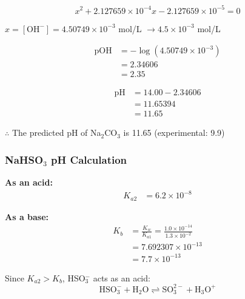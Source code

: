 \documentclass{article}
\begin{document}
\begin{equation*}
x^2 + 2.127659 \times 10^{-4}x - 2.127659 \times 10^{-5} = 0
\end{equation*}

$x = [\text{OH}^-] = 4.50749 \times 10^{-3}$ mol/L $\rightarrow 4.5 \times 10^{-3}$ mol/L

\vspace{0.1in}
\noindent
\begin{minipage}[t]{0.45\textwidth}
    \begin{align*}
        \text{pOH} &= -\log(4.50749 \times 10^{-3}) \\
        &= 2.34606 \\
        &= 2.35
    \end{align*}
\end{minipage}
\hfill
\begin{minipage}[t]{0.45\textwidth}
    \begin{align*}
        \text{pH} &= 14.00 - 2.34606 \\
        &= 11.65394 \\
        &= 11.65
    \end{align*}
\end{minipage}

\vspace{0.1in}
$\therefore$ The predicted pH of Na$_2$CO$_3$ is 11.65 (experimental: 9.9)

\subsubsection*{NaHSO$_3$ pH Calculation}


\noindent
\begin{minipage}[t]{0.45\textwidth}
    \textbf{As an acid:}
    \begin{align*}
        K_{a2} &= 6.2 \times 10^{-8}
    \end{align*}
\end{minipage}
\hfill
\begin{minipage}[t]{0.45\textwidth}
    \textbf{As a base:}
    \begin{align*}
        K_b &= \frac{K_w}{K_{a1}} = \frac{1.0 \times 10^{-14}}{1.3 \times 10^{-2}} \\
        &= 7.692307 \times 10^{-13} \\
        &= 7.7 \times 10^{-13}
    \end{align*}
\end{minipage}

\vspace{0.1in}
Since $K_{a2} > K_b$, HSO$_3^-$ acts as an acid:
\begin{equation*}
\text{HSO}_3^- + \text{H}_2\text{O} \rightleftharpoons \text{SO}_3^{2-} + \text{H}_3\text{O}^+
\end{equation*}
\end{document}
